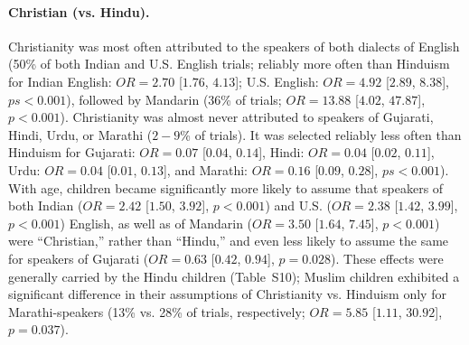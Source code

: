\documentclass{foushee-adapted-preprint}
\newcommand{\religionchirelmodeltab}{S10}
\begin{document}
\paragraph{Christian (vs. Hindu).}
Christianity was most often attributed to the speakers of both dialects of English (50\% of both Indian and U.S. English trials; reliably more often than Hinduism for Indian English: $OR=2.70$ [$1.76$, $4.13$]; U.S. English: $OR=4.92$ [$2.89$, $8.38$], $ps<0.001$), followed by Mandarin (36\% of trials; $OR=13.88$ [$4.02$, $47.87$], $p<0.001$). 
Christianity was almost never attributed to speakers of Gujarati, Hindi, Urdu, or Marathi ($2-9$\% of trials). 
It was selected reliably less often than Hinduism for Gujarati: $OR=0.07$ [$0.04$, $0.14$], Hindi: $OR=0.04$ [$0.02$, $0.11$], Urdu: $OR=0.04$ [$0.01$, $0.13$], and Marathi: $OR=0.16$ [$0.09$, $0.28$], $ps<0.001$). 
With age, children became significantly more likely to assume that speakers of both Indian ($OR=2.42$ [$1.50$, $3.92$], $p<0.001$) and U.S. ($OR=2.38$ [$1.42$, $3.99$], $p<0.001$) English, as well as of Mandarin ($OR=3.50$ [$1.64$, $7.45$], $p<0.001$) were ``Christian,'' rather than ``Hindu,'' and even less likely to assume the same for speakers of Gujarati ($OR=0.63$ [$0.42$, $0.94$], $p=0.028$). These effects were generally carried by the Hindu children (Table~\religionchirelmodeltab); Muslim children exhibited a significant difference in their assumptions of Christianity vs. Hinduism only for Marathi-speakers (13\% vs. 28\% of trials, respectively; $OR=5.85$ [$1.11$, $30.92$], $p=0.037$). %
\end{document}
